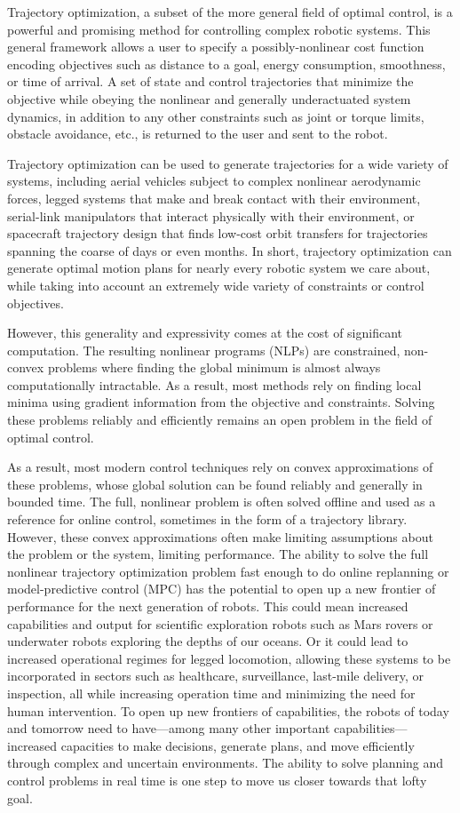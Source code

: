 \documentclass[../root.tex]{subfiles}
\begin{document}
Trajectory optimization, a subset of the more general field of optimal
control, is a powerful and promising method for controlling complex robotic
systems. This general framework allows a user to specify a possibly-nonlinear
cost function encoding objectives such as distance to a goal, energy
consumption, smoothness, or time of arrival. A set of state and control
trajectories that minimize the objective while obeying the nonlinear and
generally underactuated system dynamics, in addition to any other constraints
such as joint or torque limits, obstacle avoidance, etc., is returned to the
user and sent to the robot.

Trajectory optimization can be used to generate trajectories for a wide
variety of systems, including aerial vehicles subject to complex nonlinear
aerodynamic forces, legged systems that make and break contact with their
environment, serial-link manipulators that interact physically with their
environment, or spacecraft trajectory design that finds low-cost orbit
transfers for trajectories spanning the coarse of days or even months. In
short, trajectory optimization can generate optimal motion plans for nearly
every robotic system we care about, while taking into account an extremely
wide variety of constraints or control objectives.

However, this generality and expressivity comes at the cost of significant
computation. The resulting nonlinear programs (NLPs) are constrained,
non-convex problems where finding the global minimum is almost always
computationally intractable. As a result, most methods rely on finding local
minima using gradient information from the objective and constraints. Solving
these problems reliably and efficiently remains an open problem in the field
of optimal control.

As a result, most modern control techniques rely on convex approximations of
these problems, whose global solution can be found reliably and generally in
bounded time. The full, nonlinear problem is often solved offline and used as a
reference for online control, sometimes in the form of a trajectory library.
However, these convex approximations often make limiting assumptions about the
problem or the system, limiting performance. The ability to solve the full
nonlinear trajectory optimization problem fast enough to do online replanning or
model-predictive control (MPC) has the potential to open up a new frontier of
performance for the next generation of robots. This could mean increased
capabilities and output for scientific exploration robots such as Mars rovers or
underwater robots exploring the depths of our oceans. Or it could lead to
increased operational regimes for legged locomotion, allowing these systems to
be incorporated in sectors such as healthcare, surveillance, last-mile delivery,
or inspection, all while increasing operation time and minimizing the need for
human intervention. To open up new frontiers of capabilities, the robots of
today and tomorrow need to have---among many other important 
capabilities---increased capacities to make decisions, generate plans, and move
efficiently through complex and uncertain environments. The ability to solve
planning and control problems in real time is one step to move us closer towards
that lofty goal.
\end{document}
